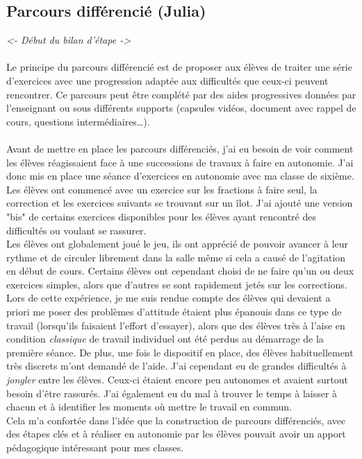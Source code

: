 \subsection{Parcours différencié (Julia)}

\textit{<- Début du bilan d'étape ->}
\paragraph{}
Le principe du parcours différencié est de proposer aux élèves de traiter une série d'exercices avec une progression adaptée aux difficultés que ceux-ci peuvent rencontrer. Ce parcours peut être complété par des aides progressives données par l'enseignant ou sous différents supports (capsules vidéos, document avec rappel de cours, questions intermédiaires\ldots ).
\paragraph{}
Avant de mettre en place les parcours différenciés, j'ai eu besoin de voir comment les élèves réagissaient face à une successions de travaux à faire en autonomie. J'ai donc mis en place une séance d'exercices en autonomie avec ma classe de sixième. \\
Les élèves ont commencé avec un exercice sur les fractions à faire seul, la correction et les exercices suivants se trouvant sur un îlot. J'ai ajouté une version "bis" de certains exercices disponibles pour les élèves ayant rencontré des difficultés ou voulant se rassurer. \\
Les élèves ont globalement joué le jeu, ils ont apprécié de pouvoir avancer à leur  rythme et de circuler librement dans la salle même si cela a causé de l'agitation en début de cours. Certains élèves ont cependant choisi de ne faire qu'un ou deux exercices simples, alors que d'autres se sont rapidement jetés sur les corrections.\\
\newline
Lors de cette expérience, je me suis rendue compte des élèves qui devaient a priori me poser des problèmes d'attitude étaient plus épanouis dans ce type de travail (lorsqu'ils faisaient l'effort d'essayer), alors que des élèves très à l'aise en condition \emph{classique} de travail individuel ont été perdus au démarrage de la première séance. De plus, une fois le dispositif en place, des élèves habituellement très discrets m'ont demandé de l'aide. J'ai cependant eu de grandes difficultés à \emph{jongler} entre les élèves. Ceux-ci étaient encore peu autonomes et avaient surtout besoin d'être rassurés. J'ai également eu du mal à trouver le temps à laisser à chacun et à identifier les moments où mettre le travail en commun.\\
Cela m'a confortée dans l'idée que la construction de parcours différenciés, avec des étapes clés et à réaliser en autonomie par les élèves pouvait avoir un apport pédagogique intéressant pour mes classes.

